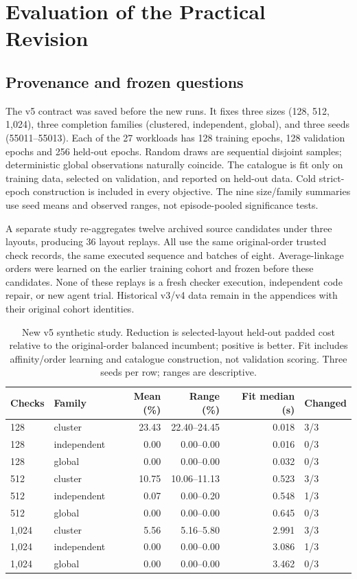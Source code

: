 \section{Evaluation of the Practical Revision}\label{sec:eval}
\subsection{Provenance and frozen questions}\label{sec:provenance}
The v5 contract was saved before the new runs. It fixes three sizes (128, 512,
1{,}024), three completion families (clustered, independent, global), and three
seeds (55011--55013). Each of the 27 workloads has 128 training epochs, 128
validation epochs and 256 held-out epochs. Random draws are sequential disjoint
samples; deterministic global observations naturally coincide. The catalogue is
fit only on training data, selected on validation, and reported on held-out data.
Cold strict-epoch construction is included in every objective. The nine
size/family summaries use seed means and observed ranges, not episode-pooled
significance tests.

A separate study re-aggregates twelve archived source candidates under three
layouts, producing 36 layout replays. All use the same original-order trusted
check records, the same executed sequence and batches of eight.
Average-linkage orders were learned on the earlier training cohort and frozen
before these candidates. None of these replays is a fresh checker execution,
independent code repair, or new agent trial. Historical v3/v4 data remain in the
appendices with their original cohort identities.

\begin{table}[t]\centering\small
\caption{New v5 synthetic study. Reduction is selected-layout held-out padded cost relative to the original-order balanced incumbent; positive is better. Fit includes affinity/order learning and catalogue construction, not validation scoring. Three seeds per row; ranges are descriptive.}\label{tab:v5synthetic}
\begin{tabularx}{\linewidth}{@{}l l r r r l@{}}\toprule
Checks & Family & Mean (\%) & Range (\%) & Fit median (s) & Changed\\\midrule
128 & cluster & 23.43 & 22.40--24.45 & 0.018 & 3/3\\
128 & independent & 0.00 & 0.00--0.00 & 0.016 & 0/3\\
128 & global & 0.00 & 0.00--0.00 & 0.032 & 0/3\\
512 & cluster & 10.75 & 10.06--11.13 & 0.523 & 3/3\\
512 & independent & 0.07 & 0.00--0.20 & 0.548 & 1/3\\
512 & global & 0.00 & 0.00--0.00 & 0.645 & 0/3\\
1{,}024 & cluster & 5.56 & 5.16--5.80 & 2.991 & 3/3\\
1{,}024 & independent & 0.00 & 0.00--0.00 & 3.086 & 1/3\\
1{,}024 & global & 0.00 & 0.00--0.00 & 3.462 & 0/3\\
\bottomrule\end{tabularx}\end{table}

